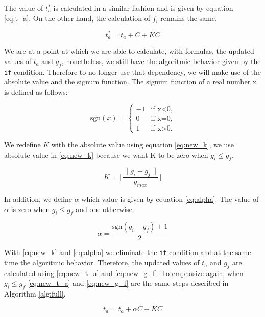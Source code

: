 \documentclass[
  12pt,
  a4paperpaper,
]{report}
\begin{document}
The value of \(t^{*}_a\) is calculated in a similar fashion and is given
by equation \ref{eq:t_a}. On the other hand, the calculation of \(f_i\)
remains the same.

\begin{equation}
t^{*}_a = t_a + C+ KC
\label{eq:t_a}
\end{equation}

We are at a point at which we are able to calculate, with formulas, the
updated values of \(t_a\) and \(g_f\), nonetheless, we still have the
algoritmic behavior given by the \texttt{if} condition. Therefore to no
longer use that dependency, we will make use of the absolute value and
the signum function. The signum function of a real number x is defined
as follows:

\begin{equation}
\mathrm{sgn}(x)=
    \begin{cases}
        -1  & \text{if    x<0,}\\
        0   & \text{if    x=0,}\\
        1   & \text{if    x>0.}
    \end{cases} 
\end{equation}

We redefine \(K\) with the absolute value using equation \ref{eq:new_k},
we use absolute value in \ref{eq:new_k} because we want K to be zero
when \(g_i \leq g_f\).

\begin{equation}
K = \lfloor \frac{ \| g_i - g_f \|}{g_{max}} \rfloor
\label{eq:new_k}
\end{equation}

In addition, we define \(\alpha\) which value is given by equation
\ref{eq:alpha}. The value of \(\alpha\) is zero when \(g_i \leq g_f\)
and one otherwise.

\begin{equation}
\alpha =  \frac{ \mathrm{sgn}(g_i-g_f) + 1 }{2}
\label{eq:alpha}
\end{equation}

With \ref{eq:new_k} and \ref{eq:alpha} we eliminate the \texttt{if}
condition and at the same time the algoritmic behavior. Therefore, the
updated values of \(t_a\) and \(g_f\) are calculated using
\ref{eq:new_t_a} and \ref{eq:new_g_f}. To emphasize again, when
\(g_i \leq g_f\) \ref{eq:new_t_a} and \ref{eq:new_g_f} are the same
steps described in Algorithm \ref{alg:full}.

\begin{equation}
t_a = t_a + \alpha C+ KC
\label{eq:new_t_a}
\end{equation}
\end{document}
